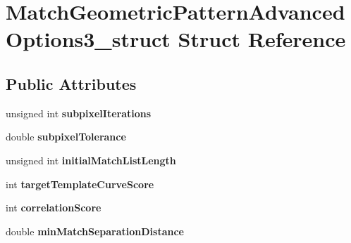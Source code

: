 \hypertarget{structMatchGeometricPatternAdvancedOptions3__struct}{
\section{MatchGeometricPatternAdvancedOptions3\_\-struct Struct Reference}
\label{structMatchGeometricPatternAdvancedOptions3__struct}
}
\subsection*{Public Attributes}
\begin{DoxyCompactItemize}
\item 
\hypertarget{structMatchGeometricPatternAdvancedOptions3__struct_ae0b0f1e57463a751bc54425f8652cb05}{
unsigned int {\bfseries subpixelIterations}}
\label{structMatchGeometricPatternAdvancedOptions3__struct_ae0b0f1e57463a751bc54425f8652cb05}

\item 
\hypertarget{structMatchGeometricPatternAdvancedOptions3__struct_af0c7cf9094bb7d47d8c9d8cd2760729a}{
double {\bfseries subpixelTolerance}}
\label{structMatchGeometricPatternAdvancedOptions3__struct_af0c7cf9094bb7d47d8c9d8cd2760729a}

\item 
\hypertarget{structMatchGeometricPatternAdvancedOptions3__struct_aae29f136aa741130c3aff8b2ed1b4b30}{
unsigned int {\bfseries initialMatchListLength}}
\label{structMatchGeometricPatternAdvancedOptions3__struct_aae29f136aa741130c3aff8b2ed1b4b30}

\item 
\hypertarget{structMatchGeometricPatternAdvancedOptions3__struct_afd00fd5b82e88166296bd6f9a0177b7d}{
int {\bfseries targetTemplateCurveScore}}
\label{structMatchGeometricPatternAdvancedOptions3__struct_afd00fd5b82e88166296bd6f9a0177b7d}

\item 
\hypertarget{structMatchGeometricPatternAdvancedOptions3__struct_ab8ea4fd0f1cf8f0715fcb1875b802235}{
int {\bfseries correlationScore}}
\label{structMatchGeometricPatternAdvancedOptions3__struct_ab8ea4fd0f1cf8f0715fcb1875b802235}

\item 
\hypertarget{structMatchGeometricPatternAdvancedOptions3__struct_a80b6dfa4cc8fc50641f323e64aaa3c95}{
double {\bfseries minMatchSeparationDistance}}
\label{structMatchGeometricPatternAdvancedOptions3__struct_a80b6dfa4cc8fc50641f323e64aaa3c95}


\end{DoxyCompactItemize}
